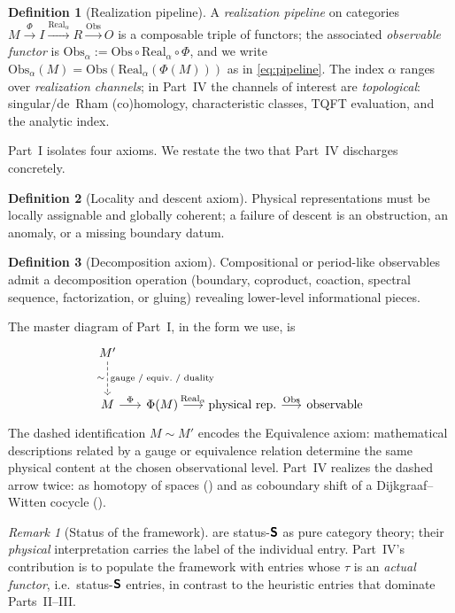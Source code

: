 \documentclass[12pt]{article}
\theoremstyle{definition}
\newtheorem{definition}[definition]{Definition}
\theoremstyle{remark}
\newtheorem{remark}[remark]{Remark}
\newcommand{\Real}{\mathrm{Real}}
\newcommand{\Obs}{\mathrm{Obs}}
\newcommand{\Sfont}{\textnormal{\sffamily\bfseries S}}
\begin{document}
\begin{definition}[Realization pipeline]
\label{def:pipeline}
A \emph{realization pipeline} on categories $M\xrightarrow{\Phi}I
\xrightarrow{\Real_\alpha}R\xrightarrow{\Obs}O$ is a composable triple of
functors; the associated \emph{observable functor} is
$\Obs_\alpha := \Obs\circ\Real_\alpha\circ\Phi$, and we write
$\Obs_\alpha(M)=\Obs(\Real_\alpha(\Phi(M)))$ as in \eqref{eq:pipeline}. The
index $\alpha$ ranges over \emph{realization channels}; in Part~IV the channels
of interest are \emph{topological}: singular/de~Rham (co)homology, characteristic
classes, TQFT evaluation, and the analytic index.
\end{definition}

Part~I isolates four axioms. We restate the two that Part~IV discharges
concretely.

\begin{definition}[Locality and descent axiom]
\label{ax:locality}
Physical representations must be locally assignable and globally coherent; a
failure of descent is an obstruction, an anomaly, or a missing boundary datum.
\end{definition}

\begin{definition}[Decomposition axiom]
\label{ax:decomp}
Compositional or period-like observables admit a decomposition operation
(boundary, coproduct, coaction, spectral sequence, factorization, or gluing)
revealing lower-level informational pieces.
\end{definition}

The master diagram of Part~I, in the form we use, is
\[
\begin{tikzcd}[column sep=1.6em, row sep=large]
M' \arrow[d, dashed, "\sim"', "\text{gauge / equiv.\ / duality}"] & & &\\
M \arrow[r, "\Phi"] & \Phi(M) \arrow[r, "\Real_\alpha"] & \text{physical rep.} \arrow[r, "\Obs"] & \text{observable}
\end{tikzcd}
\]
The dashed identification $M\sim M'$ encodes the Equivalence axiom: mathematical
descriptions related by a gauge or equivalence relation determine the same
physical content at the chosen observational level. Part~IV realizes the dashed
arrow twice: as homotopy of spaces () and as coboundary shift
of a Dijkgraaf--Witten cocycle ().

\begin{remark}[Status of the framework]
\label{rem:framework-status}
 are status-$\Sfont$ as pure category theory;
their \emph{physical} interpretation carries the label of the individual entry.
Part~IV's contribution is to populate the framework with entries whose $\tau$ is
an \emph{actual functor}, i.e.\ status-$\Sfont$ entries, in contrast to the
heuristic entries that dominate Parts~II--III.
\end{remark}
\end{document}
